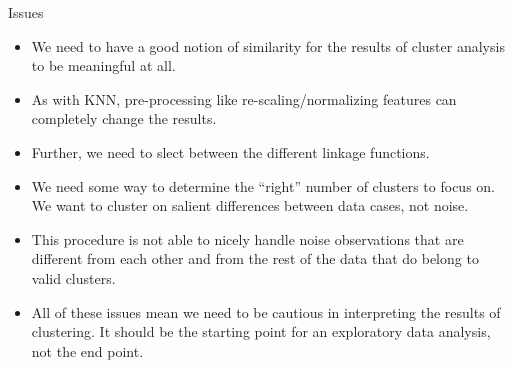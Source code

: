 \documentclass[serif,xcolor=pdftex,dvipsnames,table,hyperref={bookmarks=false,breaklinks}]{beamer}
\begin{document}
\begin{frame}[t]{Issues}

\begin{itemize}
\item We need to have a good notion of similarity for the results of cluster 
analysis to be meaningful at all.

\pause\item As with KNN, pre-processing like re-scaling/normalizing features can
completely change the results. 

\pause\item Further, we need to slect between the different linkage functions.

\pause\item We need some way to determine the ``right'' number of clusters to 
focus on. We want to cluster on salient differences between data cases, not 
noise.

\pause \item This procedure is not able to nicely handle noise observations 
that are different from each other and from the rest of the data that do 
belong to valid clusters.

\pause \item All of these issues mean we need to be cautious in interpreting 
the results of clustering. It should  be the starting point for an exploratory 
data analysis, not the end point. 

\end{itemize}
\end{frame}
\end{document}
